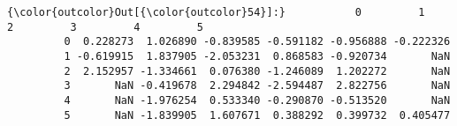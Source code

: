 \documentclass[11pt]{article}
\begin{document}
\begin{Verbatim}[commandchars=\\\{\}]
{\color{outcolor}Out[{\color{outcolor}54}]:}           0         1         2         3         4         5
         0  0.228273  1.026890 -0.839585 -0.591182 -0.956888 -0.222326
         1 -0.619915  1.837905 -2.053231  0.868583 -0.920734       NaN
         2  2.152957 -1.334661  0.076380 -1.246089  1.202272       NaN
         3       NaN -0.419678  2.294842 -2.594487  2.822756       NaN
         4       NaN -1.976254  0.533340 -0.290870 -0.513520       NaN
         5       NaN -1.839905  1.607671  0.388292  0.399732  0.405477
\end{Verbatim}
            

    
    
    
    
\end{document}
